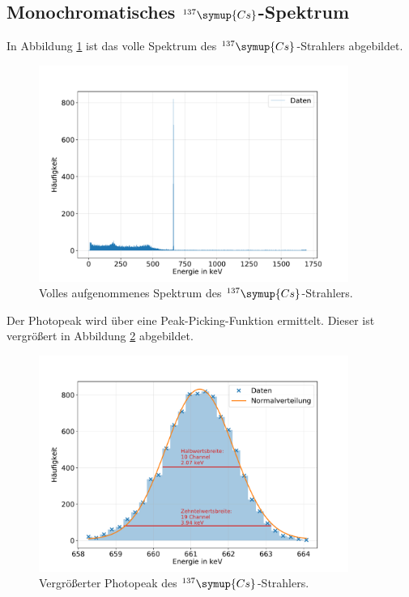 
\FloatBarrier
\subsection{Monochromatisches $^{137}\symup{Cs}$-Spektrum}
In Abbildung \ref{fig:cs_spectrum} ist das volle Spektrum des $^{137}\symup{Cs}$-Strahlers abgebildet.
\begin{figure}[h!]
  \centering
  \includegraphics[width=0.9\textwidth]{content/images/caesium_vollesspektrum.pdf}
  \caption{Volles aufgenommenes Spektrum des $^{137}\symup{Cs}$-Strahlers.}
  \label{fig:cs_spectrum}
\end{figure}
Der Photopeak wird über eine Peak-Picking-Funktion ermittelt.
Dieser ist vergrößert in Abbildung \ref{fig:cs_photopeak} abgebildet.
\begin{figure}[h!]
  \centering
  \includegraphics[width=0.9\textwidth]{content/images/caesium_peak_1.pdf}
  \caption{Vergrößerter Photopeak des $^{137}\symup{Cs}$-Strahlers.}
  \label{fig:cs_photopeak}
\end{figure}
